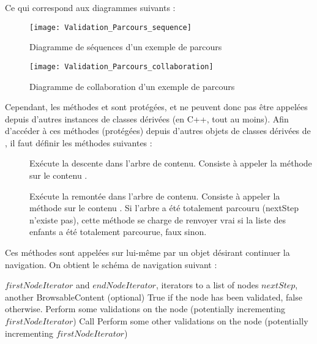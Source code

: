 Ce qui correspond aux diagrammes suivants :
\begin{figure}[H]
\caption{Diagramme de séquences d'un exemple de parcours}
\texttt{[image: Validation\_Parcours\_sequence]}
\end{figure}
\begin{figure}[H]
\caption{Diagramme de collaboration d'un exemple de parcours}
\texttt{[image: Validation\_Parcours\_collaboration]}
\end{figure}

Cependant, les méthodes  et  sont protégées, et ne peuvent donc pas être appelées depuis d'autres instances de classes dérivées (en C++, tout au moins). Afin d'accéder à ces méthodes (protégées) depuis d'autres objets de classes dérivées de , il faut définir les méthodes suivantes :
\begin{description}
\item[] Exécute la descente dans l'arbre de contenu. Consiste à appeler la méthode  sur le contenu .
\item[] Exécute la remontée dans l'arbre de contenu. Consiste à appeler la méthode  sur le contenu . Si l'arbre a été totalement parcouru (nextStep n'existe pas), cette méthode se charge de renvoyer vrai si la liste des enfants a été totalement parcourue, faux sinon.
\end{description}

Ces méthodes sont appelées sur lui-même par un objet désirant continuer la navigation.
On obtient le schéma de navigation suivant :
\begin{algorithm}[H]
\caption{}
\begin{algorithmic}
\REQUIRE $firstNodeIterator$ and $endNodeIterator$, iterators to a list of nodes
\REQUIRE $nextStep$, another BrowsableContent (optional)
\ENSURE True if the node has been validated, false otherwise.
\STATE Perform some validations on the node (potentially incrementing $firstNodeIterator$)
\STATE Call \browseDown
\ENDFOR
\STATE Perform some other validations on the node (potentially incrementing $firstNodeIterator$)
\RETURN \browseUp
\ELSE
\RETURN \FALSE
\ENDIF
\end{algorithmic}
\end{algorithm}

